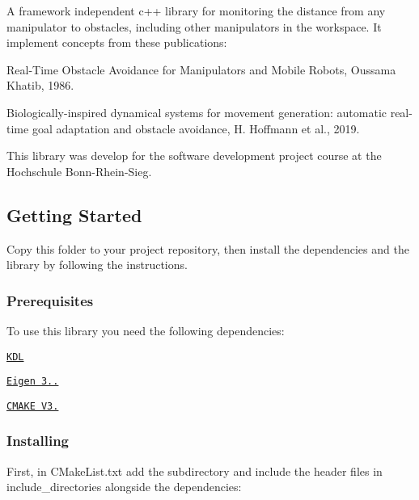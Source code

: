 A framework independent c++ library for monitoring the distance from any manipulator to obstacles, including other manipulators in the workspace. It implement concepts from these publications\+:


\begin{DoxyItemize}
\item Real-\/\+Time Obstacle Avoidance for Manipulators and Mobile Robots, Oussama Khatib, 1986.
\item Biologically-\/inspired dynamical systems for movement generation\+: automatic real-\/time goal adaptation and obstacle avoidance, H. Hoffmann et al., 2019.
\end{DoxyItemize}

This library was develop for the software development project course at the Hochschule Bonn-\/\+Rhein-\/\+Sieg.

\subsection*{Getting Started}

Copy this folder to your project repository, then install the dependencies and the library by following the instructions.

\subsubsection*{Prerequisites}

To use this library you need the following dependencies\+:


\begin{DoxyItemize}
\item \href{https://www.orocos.org/kdl/installation-manual}{\tt K\+DL}
\item \href{http://eigen.tuxfamily.org}{\tt Eigen 3..}
\item \href{https://cmake.org/download/}{\tt C\+M\+A\+KE V3.}
\end{DoxyItemize}

\subsubsection*{Installing}

First, in C\+Make\+List.\+txt add the subdirectory and include the header files in {\ttfamily include\+\_\+directories} alongside the dependencies\+:




